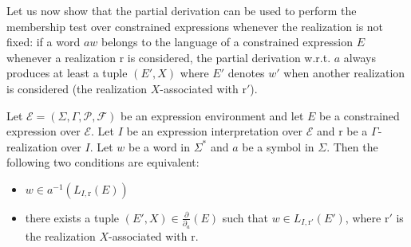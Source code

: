 \documentclass[a4paper]{llncs}
\begin{document}
  Let us now show that the partial derivation can be used to perform the membership test over constrained expressions whenever the realization is not fixed: if a word $aw$ belongs to the language of a constrained expression $E$ whenever a realization $\mathrm{r}$ is considered, the partial derivation w.r.t. $a$ always produces at least a tuple $(E',X)$ where $E'$ denotes $w'$ when another realization is considered (the realization $X$-associated with $\mathrm{r}'$). 
  
  \begin{proposition}\label{prop eq quot deriv part}
    Let $\mathcal{E}=(\Sigma,\Gamma,\mathcal{P},\mathcal{F})$ be an expression environment and let $E$ be a constrained expression over $\mathcal{E}$. Let $I$ be an expression interpretation over $\mathcal{E}$ and $\mathrm{r}$ be a $\Gamma$-realization over $I$. Let $w$ be a word in $\Sigma^*$ and $a$ be a symbol in $\Sigma$. Then the  following  two conditions are equivalent:
    \begin{itemize}
      \item $w \in a^{-1}(L_{I,\mathrm{r}}(E))$
      \item there exists a tuple $(E',X)\in\frac{\partial}{\partial_a}(E)$ such that $w \in L_{I,\mathrm{r}'}(E')$, where $\mathrm{r}'$ is the realization $X$-associated with $\mathrm{r}$.
    \end{itemize}
  \end{proposition}
\end{document}
